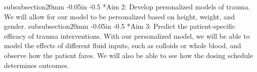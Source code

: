 \documentclass[11pt]{article}
\makeatletter
\renewcommand\subsubsection{\@startsection
	{subsubsection}{2}{0mm}
	{-0.05in}
	{-0.5\baselineskip}
	{\normalfont\normalsize\bfseries}}
\makeatother
\begin{document}
\subsubsection*{Aim 2: Develop personalized models of trauma. }
We will allow for our model to be personalized based on height, weight, and gender. 
\subsubsection*{Aim 3: Predict the patient-specific efficacy of trauma interventions.} With our personalized model, we will be able to model the effects of different fluid inputs, such as colloids or whole blood, and observe how the patient fares. We will also be able to see how the dosing schedule determines outcomes.

%
\end{document}
